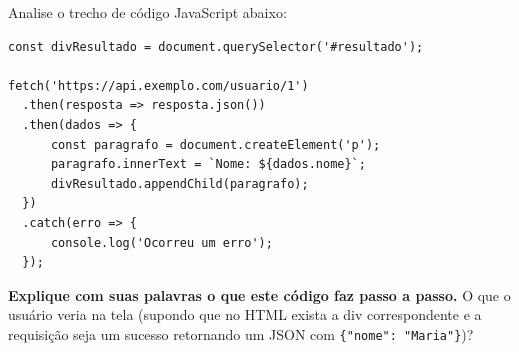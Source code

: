 \documentclass[12pt,a4paper]{article}
\newcommand{\checkGabarito}[1]{\iftoggle{gabarito}{\hspace{0.5cm} \textbf{\color{corGabarito}--- #1}}{}}
\begin{document}
\begin{tcolorbox}[colback=azulTitulo!5, colframe=azulTitulo, title=Questão 10: Leitura de Código com Fetch API]
    Analise o trecho de código JavaScript abaixo:

    \begin{tcolorbox}[colback=cinzaCodigo, colframe=black, arc=2pt, boxrule=0.5pt]
\begin{verbatim}
const divResultado = document.querySelector('#resultado');

fetch('https://api.exemplo.com/usuario/1')
  .then(resposta => resposta.json())
  .then(dados => {
      const paragrafo = document.createElement('p');
      paragrafo.innerText = `Nome: ${dados.nome}`;
      divResultado.appendChild(paragrafo);
  })
  .catch(erro => {
      console.log('Ocorreu um erro');
  });
\end{verbatim}
    \end{tcolorbox}

    \textbf{Explique com suas palavras o que este código faz passo a passo.} O que o usuário veria na tela (supondo que no HTML exista a div correspondente e a requisição seja um sucesso retornando um JSON com \texttt{\{"nome": "Maria"\}})?
    \vspace{4cm}

    \checkGabarito{\textbf{Resposta esperada:} 
    1. O código seleciona a div de ID "resultado" do HTML. 
    2. Faz uma requisição assíncrona para a API usando fetch. 
    3. Quando a resposta chega, ela é convertida para JSON no primeiro then(). 
    4. No segundo then(), o código cria dinamicamente uma tag <p>, adiciona o texto "Nome: Maria" (usando o dado que veio da API) e insere esse parágrafo dentro da div "resultado" usando appendChild. 
    5. O usuário veria aparecer na tela o texto "Nome: Maria".}
\end{tcolorbox}
\end{document}
